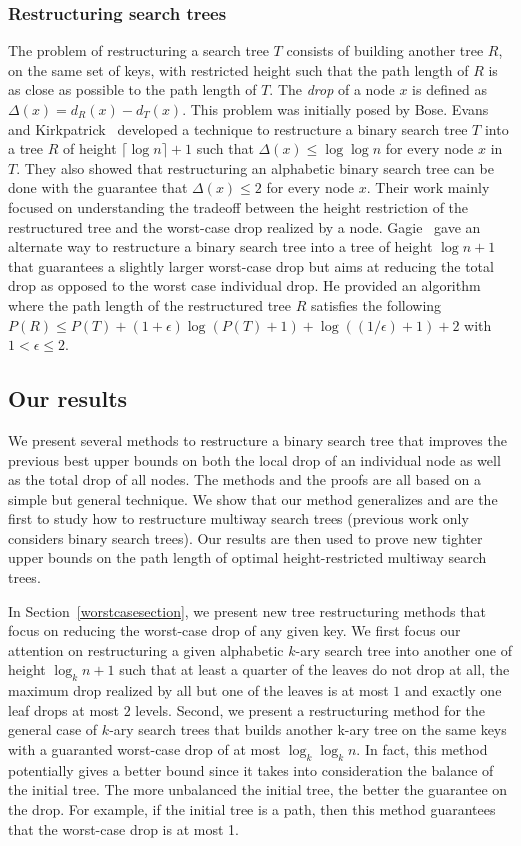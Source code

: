 \documentclass{llncs}\usepackage[english]{babel}
\begin{document}
\subsubsection*{Restructuring search trees}
The problem of restructuring a search tree $T$ consists of building another tree $R$, on the same set of keys, with restricted height such that the path length of $R$ is as close as possible to the path length of $T$. The \emph{drop} of a node $x$ is defined as $\Delta(x)=d_R(x)-d_T(x)$. This problem was initially posed by Bose. Evans and Kirkpatrick~\cite{restructuringordered} developed a technique to restructure a binary search tree $T$ into a tree $R$ of height $\lceil \log n \rceil +1$ such that $\Delta(x)\leq \log \log n$ for every node $x$ in $T$. They also showed that restructuring an alphabetic binary search tree can be done with the guarantee that $\Delta(x)\leq 2$ for every node $x$. Their work mainly focused on understanding the tradeoff between the height restriction of the restructured tree and the worst-case drop realized by a node. Gagie~\cite{Gagie} gave an alternate way to restructure a binary search tree into a tree of height $\log n +1$ that guarantees a slightly larger worst-case drop but aims at reducing the total drop as opposed to the worst case individual drop. He provided an algorithm where the path length of the restructured tree $R$ satisfies the following $P(R)\leq P(T)+(1+\epsilon)\log(P(T)+1)+\log((1/\epsilon)+1)+2$ with $1<\epsilon \leq 2$. 


\subsection{Our results}
We present several methods to restructure a binary search tree that improves the previous best upper bounds on both the local drop of an individual node as well as the total drop of all nodes. The methods and the proofs are all based on a simple but general technique. We show that our method generalizes and are the first to study how to restructure multiway search trees (previous work only considers binary search trees).  Our results are then used to prove new tighter upper bounds on the path length of optimal height-restricted multiway search trees.

In Section~\ref{worstcasesection}, we present new tree restructuring methods that focus on reducing the worst-case drop of any given key. We first focus our attention on restructuring a given alphabetic $k$-ary search tree into another one of height $\log_k n +1$ such that at least a quarter of the leaves do not drop at all, the maximum drop realized by all but one of the leaves is at most $1$ and
exactly one leaf drops at most $2$ levels. Second, we present a restructuring method for the general case of $k$-ary search trees that builds another k-ary tree on the same keys with a guaranted worst-case drop of at most $\log_k \log_k n$. In fact, this method potentially gives a better bound since it takes into consideration the balance of the initial tree. The more unbalanced the initial tree, the better the guarantee on the drop. For example, if the initial tree is a path, then this method guarantees that the worst-case drop is at most 1.
\end{document}
